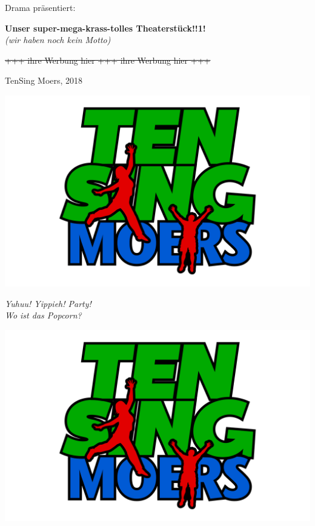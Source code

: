 \begin{center}
\Huge{Drama präsentiert}:

\vspace{2cm}
\Huge\textbf{Unser super-mega-krass-tolles Theaterstück!!1!}\\
\textit{(wir haben noch kein Motto)}

\vspace{1cm}

\Large \st{+++ ihre Werbung hier +++ ihre Werbung hier +++}

\vspace{1.5cm}

\Large TenSing Moers, 2018

\vspace*{15mm}

\includegraphics[scale=.4,trim=100mm 0mm 100mm 0mm]{res/TEN_SING_Logo}
\end{center}

\vspace*{\fill}
\begin{flushright}
\textit{Yuhuu! Yippieh! Party!}\\
\textit{Wo ist das Popcorn?}
\end{flushright}

\tableofcontents

\vspace{3mm}

\begin{minipage}{\textwidth}
\begin{center}
\includegraphics[scale=.3,trim=100mm 0mm 100mm 0mm]{res/TEN_SING_Logo}
\end{center}
\end{minipage}

